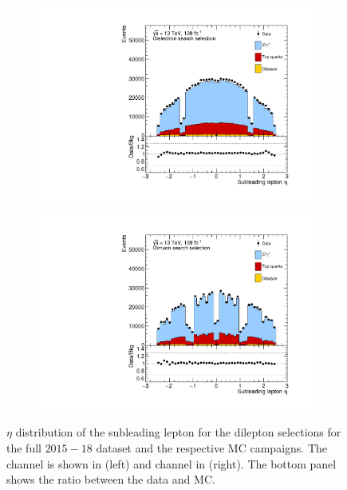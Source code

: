 \begin{figure}[]
    \centering
    \begin{subfigure}[b]{0.49\textwidth}
        \centering
        \includegraphics[width=\textwidth]{figures/analysis/datamc/dataMCcompare/ee_eta2.pdf}
        \label{fig:datamc:eeeta2}
    \end{subfigure}
    \begin{subfigure}[b]{0.49\textwidth}
        \centering
        \includegraphics[width=\textwidth]{figures/analysis/datamc/dataMCcompare/uu_eta2.pdf}
        \label{fig:datamc:uueta2}
    \end{subfigure}
    \caption[$\eta$ distribution of the subleading lepton for the dilepton selections for the full $2015-18$ dataset and the respective MC campaigns.]{$\eta$ distribution of the subleading lepton for the dilepton selections for the full $2015-18$ dataset and the respective MC campaigns. The \ee channel is shown in (left) and \mumu channel in (right). The bottom panel shows the ratio between the data and MC.}
    \label{fig:datamc:eta2}
\end{figure}
